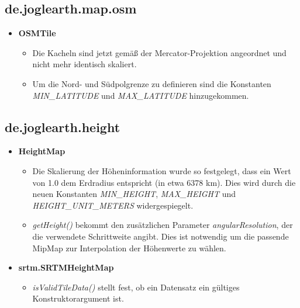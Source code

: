 \documentclass[10pt]{scrreprt}
\begin{document}
\subsection*{de.joglearth.map.osm}
\begin{itemize}
\item \textbf{OSMTile}\begin{itemize}
\item Die Kacheln sind jetzt gemäß der Mercator-Projektion angeordnet und nicht mehr identisch skaliert.
\item Um die Nord- und Südpolgrenze zu definieren sind die Konstanten \textit{MIN{\_}LATITUDE} und \textit{MAX{\_}LATITUDE} hinzugekommen.
\end{itemize}
\end{itemize}

\subsection*{de.joglearth.height}
\begin{itemize}
\item \textbf{HeightMap}\begin{itemize}
\item Die Skalierung der Höheninformation wurde so festgelegt, dass ein Wert von 1.0 dem Erdradius entspricht (in etwa 6378 km). Dies wird durch die neuen Konstanten \textit{MIN{\_}HEIGHT}, \textit{MAX{\_}HEIGHT} und \textit{HEIGHT{\_}UNIT{\_}METERS} widergespiegelt.
\item \textit{getHeight()} bekommt den zusätzlichen Parameter \textit{angularResolution}, der die verwendete Schrittweite angibt. Dies ist notwendig um die passende MipMap zur Interpolation der Höhenwerte zu wählen.
\end{itemize}
\item \textbf{srtm.SRTMHeightMap}\begin{itemize}
\item \textit{isValidTileData()} stellt fest, ob ein Datensatz ein gültiges Konstruktorargument ist.
\end{itemize}
\end{itemize}
\end{document}
